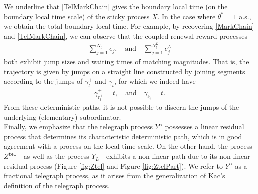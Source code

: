 \documentclass[10pt,a4paper]{article}
\numberwithin{equation}{section}
\theoremstyle{plain}
\theoremstyle{remark}
\begin{document}
We underline that \eqref{TelMarkChain} gives the boundary local time (on the boundary local time scale) of the sticky process $\bar{X}$. In the case where $\theta^*=1$ a.s., we obtain the total boundary local time. For example, by recovering \eqref{MarkChain} and \eqref{TelMarkChain}, we can observe that the coupled renewal reward processes
\begin{align*}
\sum_{j=1}^{N_t} e_j, \quad \textrm{and} \quad \sum_{j=1}^{N^L_t} e^L_j
\end{align*} 
both exhibit jump sizes and waiting times of matching magnitudes. That is, the trajectory is given by jumps on a straight line constructed by joining segments according to the jumps of $\gamma^+_t$ and $\bar{\gamma}_t$, for which we indeed have
\begin{align*}
\gamma^+_{r^+_t} = t, \quad \textrm{and} \quad \bar{\gamma}_{\bar{r}_t}=t.
\end{align*} 
From these deterministic paths, it is not possible to discern the jumps of the underlying (elementary) subordinator.\\

Finally, we emphasize that the telegraph process $Y^\alpha$ possesses a linear residual process that determines its characteristic deterministic path, which is in good agreement with a process on the local time scale. On the other hand, the process $Z^\mathtt{tel}$ - as well as the process $Y_L$ - exhibits a non-linear path due to its non-linear residual process (Figure \ref{fig:Ztel} and Figure \ref{fig:ZtelPart}). We refer to $Y^\alpha$ as a fractional telegraph process, as it arises from the generalization of Kac's definition of the telegraph process. 
\end{document}
